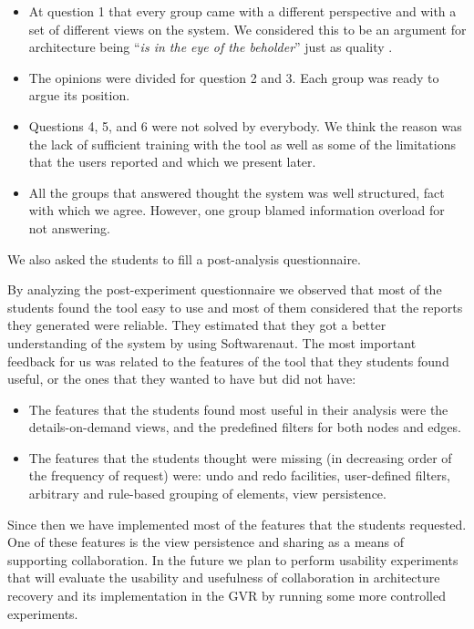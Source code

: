 \documentclass[preprint,12pt]{elsarticle}
\begin{document}
\begin{itemize}
\item At question 1 that every group came with a different perspective and with a set of different views on the system. We considered this to be an argument for architecture being ``{\em is in the eye of the beholder}'' just as quality \cite{bass-architecture}.

\item The opinions were divided for question 2 and 3. Each group was ready to argue its position. 

\item Questions 4, 5, and 6 were not solved by everybody. We think the reason was the lack of sufficient training with the tool as well as some of the limitations that the users reported and which we present later.

\item All the groups that answered thought the system was well structured, fact with which we agree. However, one group blamed information overload for not answering. 

\end{itemize}

We also asked the students to fill a post-analysis questionnaire. 

By analyzing the post-experiment questionnaire we observed that most of the students found the tool easy to use and most of them considered that the reports they generated were reliable. They estimated that they got a better understanding of the system by using Softwarenaut. The most important feedback for us was related to the features of the tool that they students found useful, or the ones that they wanted to have but did not have:

\begin{itemize}
\item The features that the students found most useful in their analysis were the details-on-demand views, and the predefined filters for both nodes and edges.
\item The features that the students thought were missing (in decreasing order of the frequency of request) were: undo and redo facilities, user-defined filters, arbitrary and rule-based grouping of elements, view persistence.

\end{itemize}

Since then we have implemented most of the features that the students requested. One of these features is the view persistence and sharing as a means of supporting collaboration. In the future we plan to perform usability experiments that will evaluate the usability and usefulness of collaboration in architecture recovery and its implementation in the GVR by running some more controlled experiments.
\end{document}
